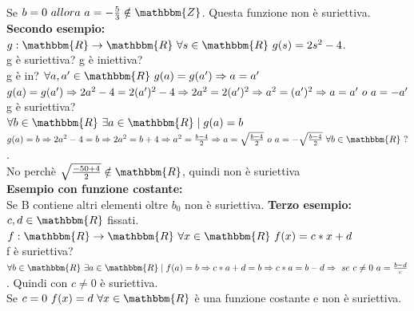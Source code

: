 \documentclass[12pt, letterpaper]{report}
\begin{document}
	\\
	Se $b = 0 \ allora \ a = -\frac{5}{3} \notin \mathbbm{Z}$. Questa funzione non è suriettiva.
	\\
	\textbf{Secondo esempio: }
	\\
	$g: \mathbbm{R} \to \mathbbm{R} \ \forall s \in \mathbbm{R} \ g(s) = 2s^2 - 4$.
	\\
	g è suriettiva? g è iniettiva?
	\\
	g è in? $\forall a,a' \in \mathbbm{R} \ g(a) = g(a') \Rightarrow a = a'$
	\\
	$g(a) = g(a') \\ \Rightarrow 2a^2 - 4 = 2(a')^2 - 4 \\ \Rightarrow 2a^2 = 2(a')^2 \\ \Rightarrow a^2 = (a')^2 \\ \Rightarrow a = a' \ o \ a = -a'$
	\\
	g è suriettiva?
	\\
	$\forall b  \in \mathbbm{R} \ \exists a \in \mathbbm{R} \mid g(a) = b$
	\\
	$g(a) = b \\ \Rightarrow 2a^2 - 4 = b \\ \Rightarrow 2a^2 = b + 4 \\ \Rightarrow a^2 = \frac{b - 4}{2} \\ \Rightarrow a = \sqrt{\frac{b-4}{2}} \ o \ a = -\sqrt{\frac{b - 4}{2}} \ \forall b \in \mathbbm{R} \ ?$.
	\\
	No perchè $\sqrt{\frac{-50 + 4}{2}} \notin \mathbbm{R}$, quindi non è suriettiva
	\\
	\textbf{Esempio con funzione costante: }
	\\
	Se B contiene altri elementi oltre $b_0$ non è suriettiva.
	\newpage
	\textbf{Terzo esempio: }
	\\
	$c,d \in \mathbbm{R}$ fissati.
	\\
	$f: \mathbbm{R} \to \mathbbm{R} \ \forall x \in \mathbbm{R} \ f(x) = c * x + d$
	\\
	f è suriettiva?
	\\
	$\forall b \in \mathbbm{R} \ \exists a \in \mathbbm{R} \mid f(a) = b \\ \Rightarrow c * a + d = b \\ \Rightarrow c *a = b - d \\ \Rightarrow \ se \ c \neq 0 \ a = \frac{b - d}{c}$. Quindi con $c \neq 0$ è suriettiva.
	\\
	Se $c = 0 \ f(x) = d \ \forall x \in \mathbbm{R}$ è una funzione costante e non è suriettiva.
\end{document}
